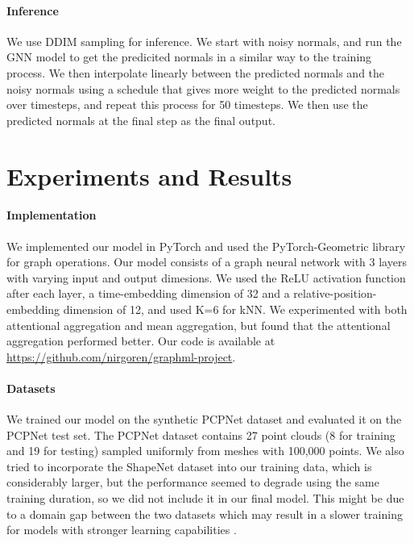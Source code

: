 \documentclass{acmart}
\newcommand{\instructions}[1]{\textcolor{red}{#1}\newline}
\renewcommand{\instructions}[1]{}    %
\begin{document}
\paragraph{Inference}
We use DDIM sampling \cite{song2020denoising} for inference. We start with noisy normals, and run the GNN model to get the predicited normals in a similar way to the training process. We then interpolate linearly between the predicted normals and the noisy normals using a schedule that gives more weight to the predicted normals over timesteps, and repeat this process for 50 timesteps. We then use the predicted normals at the final step as the final output.

\section{Experiments and Results}
\instructions{Describe in details the experiments you conducted, the datasets you use, the evaluation metric and models/other methods you compared to, how you generated your splits / where did you take the splits from, etc. Make sure to explain every experiment you show, what is the goal of this experiment? If needed, include running time /memory report, etc.
This is also the place to include details on your implementation, e.g. which libraries did you use, and a link to public github with the code (can be anonymous github) - 1-2 pages}

\paragraph{Implementation}
We implemented our model in PyTorch and used the PyTorch-Geometric library for graph operations. Our model consists of a graph neural network with 3 layers with varying input and output dimesions. We used the ReLU activation function after each layer, a time-embedding dimension of 32 and a relative-position-embedding dimension of 12, and used K=6 for kNN. We experimented with both attentional aggregation and mean aggregation, but found that the attentional aggregation performed better. Our code is available at \url{https://github.com/nirgoren/graphml-project}.

\paragraph{Datasets}
We trained our model on the synthetic PCPNet dataset \cite{guerrero2018pcpnet} and evaluated it on the PCPNet test set. The PCPNet dataset contains 27 point clouds (8 for training and 19 for testing) sampled uniformly from meshes with 100,000 points. We also tried to incorporate the ShapeNet dataset \cite{shapenet2015} into our training data, which is considerably larger, but the performance seemed to degrade using the same training duration, so we did not include it in our final model. This might be due to a domain gap between the two datasets which may result in a slower training for models with stronger learning capabilities \cite{jin2024asymmetrical}.
\end{document}
